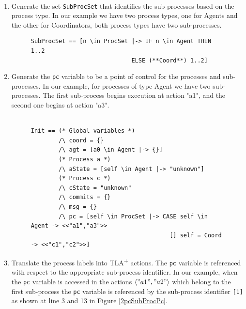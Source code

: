 \documentclass{thesul}
\newcommand{\tlaplus}{TLA\textsuperscript{+}\xspace}
\newcommand{\seq}[1]{\langle #1 \rangle}
\begin{document}
\hfill\\
\begin{enumerate}

\item Generate the set \verb|SubProcSet| that identifies the sub-processes based on the process type.
In our example we have two process types, one for Agents and the other for Coordinators, both process types have two sub-processes.

\FloatBarrier
\begin{figure}[!h]
\label{2pcSubTla}
\begin{lstlisting}[caption = Distributed PlusCal Translation- SubProcSet, frame = tlrb, firstnumber = 1]
SubProcSet == [n \in ProcSet |-> IF n \in Agent THEN 1..2
                             ELSE (**Coord**) 1..2]

\end{lstlisting}
\end{figure}
\FloatBarrier

\item Generate the \verb|pc| variable to be a point of control for the processes and sub-processes.
In our example, for processes of type Agent we have two sub-processes. The first sub-process begins execution at action "a1", and the second one begins at action "a3".
\hfill\\

\FloatBarrier
\begin{figure}[!h]
\begin{lstlisting}[caption = \tlaplus translation for Sub-Processes, frame = tlrb, firstnumber = 1]

Init == (* Global variables *)
        /\ coord = {}
        /\ agt = [a0 \in Agent |-> {}]
        (* Process a *)
        /\ aState = [self \in Agent |-> "unknown"]
        (* Process c *)
        /\ cState = "unknown"
        /\ commits = {}
        /\ msg = {}
        /\ pc = [self \in ProcSet |-> CASE self \in Agent -> <<"a1","a3">>
                                        [] self = Coord -> <<"c1","c2">>]
\end{lstlisting}
\end{figure}
\FloatBarrier

\item Translate the process labels into \tlaplus actions. The \verb|pc| variable is referenced with respect to the appropriate sub-process identifier.
In our example, when the \verb|pc| variable is accessed in the actions $\seq{"a1", "a2"}$ which belong to the first sub-process the \verb|pc| variable is referenced by the sub-process identifier \verb|[1]| as shown at line 3 and 13 in Figure \ref{2pcSubProcPc}.


\end{enumerate}
\end{document}
